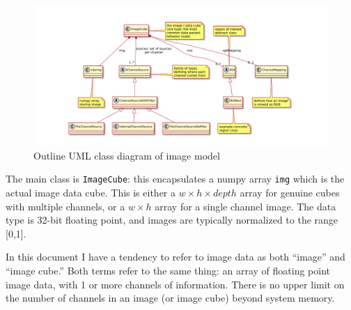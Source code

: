 \begin{figure}[ht]
\center
\includegraphics[width=6.5in]{image.pdf}
\caption{Outline UML class diagram of image model}
\label{image.pdf}
\end{figure}

The main class is \texttt{ImageCube}: this encapsulates a numpy array
\texttt{img}
which is the actual image data cube. This is either a 
$w \times h \times depth$ array for genuine cubes with multiple channels,
or a $w \times h$ array for a single channel image. The data type is 32-bit floating
point, and images are typically normalized to the range [0,1].

\begin{notebox}
In this document I have a tendency to refer to image data as both ``image'' and ``image cube.''
Both terms refer to the same thing: an array of floating point image data, with 1 or more channels
of information. There is no upper limit on the number of channels in an image (or image cube)
beyond system memory.
\end{notebox}


